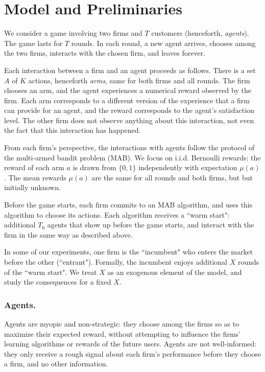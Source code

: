 \documentclass[../competing_bandits.tex]{subfiles}
\begin{document}
\section{Model and Preliminaries}\label{sec:model}

We consider a game involving two firms and $T$ customers (henceforth, \emph{agents}). The game lasts for $T$ rounds. In each round, a new agent arrives, chooses among the two firms, interacts with the chosen firm, and leaves forever. 

Each interaction between a firm and an agent proceeds as follows. There is a set $A$ of $K$ actions, henceforth \emph{arms}, same for both firms and all rounds. The firm chooses an arm, and the agent experiences a numerical reward observed by the firm. Each arm corresponds to a different version of the experience that a firm can provide for an agent, and the reward corresponds to the agent's satisfaction level. The other firm does not observe anything about this interaction, not even the fact that this interaction has happened.

From each firm's perspective, the interactions with agents follow the protocol of the multi-armed bandit problem (MAB). We focus on i.i.d. Bernoulli rewards: the  reward of each arm $a$ is drawn from $\{0,1\}$ independently with expectation $\mu(a)$. The mean rewards $\mu(a)$ are the same for all rounds and both firms, but but initially unknown.

Before the game starts, each firm commits to an MAB algorithm, and uses this algorithm to choose its actions. Each algorithm receives a ``warm start": additional $T_0$ agents that show up before the game starts, and interact with the firm in the same way as described above.

In some of our experiments, one firm is the ``incumbent" who enters the market before the other (``entrant"). Formally, the incumbent enjoys additional $X$ rounds of the ``warm start". We treat $X$ as an exogenous element of the model, and study the consequences for a fixed $X$. 



\subsubsection{Agents.}
Agents are myopic and non-strategic: they choose among the firms so as to maximize their expected reward, without attempting to influence the firms' learning algorithms or rewards of the future users. Agents are not well-informed: they only receive a rough signal about each firm's performance before they choose a firm, and no other information.
\end{document}
